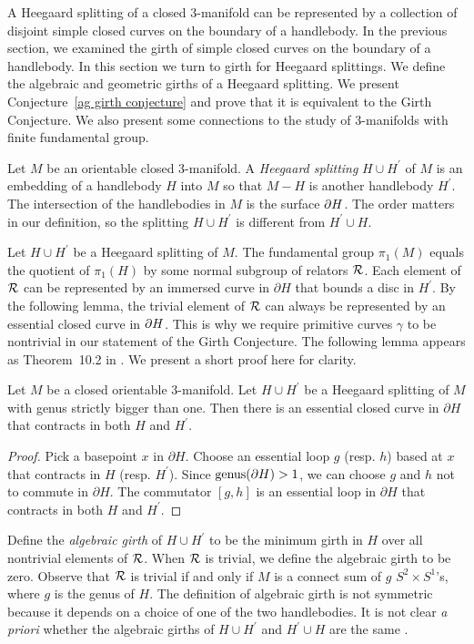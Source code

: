 A Heegaard splitting of a closed 3-manifold can be represented by a collection of disjoint simple closed curves on the boundary of a handlebody.  In the previous section, we examined the girth of simple closed curves on the boundary of a handlebody.  In this section we turn to girth for Heegaard splittings.  We define the algebraic and geometric girths of a Heegaard splitting.  We present Conjecture~\ref{ag girth conjecture} and prove that it is equivalent to the Girth Conjecture.  We also present some connections to the study of 3-manifolds with finite fundamental group.

Let $M$ be an orientable closed 3-manifold.  A \emph{Heegaard splitting} 
$H\cup H^\prime$ of $M$ is an embedding of a handlebody $H$ into $M$ so that $M-H$ is another handlebody $H^\prime$.  The intersection of the handlebodies in $M$ is the surface $\partial H$.  The order matters in our definition, so the splitting $H\cup H^\prime$ is different from $H^\prime\cup H$.  

Let $H\cup H^\prime$ be a Heegaard splitting of $M$.  The fundamental 
group $\pi_1(M)$ equals the quotient of $\pi_1(H)$ by some normal 
subgroup of relators $\mathcal{R}$.
Each element of $\mathcal{R}$ can be represented by an immersed 
curve in $\partial H$ that bounds a disc in $H^\prime$.
By the following lemma, the trivial element of $\mathcal{R}$ can 
always be represented by an essential closed curve in $\partial H$.
This is why we require primitive curves $\gamma$ to be nontrivial in our 
statement of the Girth Conjecture.
The following lemma appears as Theorem~10.2 in \cite{P}.
We present a short proof here for clarity.

\begin{lemma}
\label{trivial relator}
Let $M$ be a closed orientable $3$-manifold.  Let $H\cup H^\prime$ 
be a Heegaard splitting of $M$ with genus strictly bigger than one.  
Then there is an essential closed curve in $\partial H$ that 
contracts in both $H$ and $H^\prime$.
\end{lemma}

\begin{proof}
Pick a basepoint $x$ in $\partial H$.  Choose an essential loop
$g$ (resp. $h$) based at $x$ that contracts in $H$ (resp. $H^\prime$).
Since $\operatorname{genus}(\partial H)>1$, we can choose $g$ and $h$ not to commute
in $\partial H$.  The commutator $[g,h]$ is an essential 
loop in $\partial H$ that contracts in both $H$ and $H^\prime$.
\end{proof}

Define the \emph{algebraic girth} of $H\cup H^\prime$ to be 
the minimum girth in $H$ over all nontrivial elements of $\mathcal{R}$.  
When $\mathcal{R}$ is trivial, we define the algebraic girth to be zero.  
Observe that $\mathcal{R}$ is trivial if and only if $M$ is a connect 
sum of $g$ $S^2 \times S^1$'s, where $g$ is the genus of $H$.
The definition of algebraic girth is not symmetric because
it depends on a choice of one of the two handlebodies.  
It is not clear \emph{a priori} whether the algebraic girths of $H\cup H^{\prime}$ and $H^\prime \cup H$ are the same .

